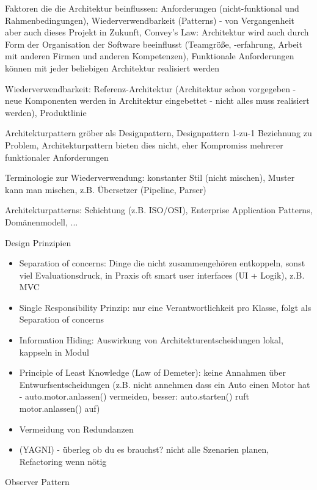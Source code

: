 \documentclass[paper=a4, fontsize=11pt]{scrartcl} %
\numberwithin{equation}{section} %
\numberwithin{figure}{section} %
\numberwithin{table}{section} %
\begin{document}
\begin{itemize}
  \item Faktoren die die Architektur beinflussen: Anforderungen (nicht-funktional und Rahmenbedingungen), Wiederverwendbarkeit (Patterns) - von Vergangenheit aber auch dieses Projekt in Zukunft, Convey's Law: Architektur wird auch durch Form der Organisation der Software beeinflusst (Teamgröße, -erfahrung, Arbeit mit anderen Firmen und anderen Kompetenzen), Funktionale Anforderungen können mit jeder beliebigen Architektur realisiert werden
  \item Wiederverwendbarkeit: Referenz-Architektur (Architektur schon vorgegeben - neue Komponenten werden in Architektur eingebettet - nicht alles muss realisiert werden), Produktlinie
  \item Architekturpattern gröber als Designpattern, Designpattern 1-zu-1 Beziehnung zu Problem, Architekturpattern bieten dies nicht, eher Kompromiss mehrerer funktionaler Anforderungen
  \item Terminologie zur Wiederverwendung: konstanter Stil (nicht mischen), Muster kann man mischen, z.B. Übersetzer (Pipeline, Parser)
  \item Architekturpatterns: Schichtung (z.B. ISO/OSI), Enterprise Application Patterns, Domänenmodell, ...
  \item Design Prinzipien
  \begin{itemize}
    \item Separation of concerns: Dinge die nicht zusammengehören entkoppeln, sonst viel Evaluationsdruck, in Praxis oft smart user interfaces (UI + Logik), z.B. MVC
    \item Single Responsibility Prinzip: nur eine Verantwortlichkeit pro Klasse, folgt als Separation of concerns
    \item Information Hiding: Auswirkung von Architekturentscheidungen lokal, kappseln in Modul
    \item Principle of Least Knowledge (Law of Demeter): keine Annahmen über Entwurfsentscheidungen (z.B. nicht annehmen dass ein Auto einen Motor hat - auto.motor.anlassen() vermeiden, besser: auto.starten() ruft motor.anlassen() auf)
    \item Vermeidung von Redundanzen
    \item (YAGNI) - überleg ob du es brauchst? nicht alle Szenarien planen, Refactoring wenn nötig
  \end{itemize}
  \begin{minipage}{.5\textwidth}
  \item Observer Pattern
    \begin{itemize}

\end{itemize}
\end{minipage}
\end{itemize}
\end{document}
